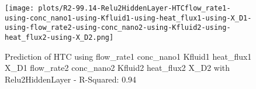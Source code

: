 
\begin{figure}[H]
    \centering
    \texttt{[image: plots/R2-99.14-Relu2HiddenLayer-HTCflow\_rate1-using-conc\_nano1-using-Kfluid1-using-heat\_flux1-using-X\_D1-using-flow\_rate2-using-conc\_nano2-using-Kfluid2-using-heat\_flux2-using-X\_D2.png]}
    \caption{Prediction of HTC using flow_rate1 conc_nano1 Kfluid1 heat_flux1 X_D1 flow_rate2 conc_nano2 Kfluid2 heat_flux2 X_D2 with Relu2HiddenLayer - R-Squared: 0.94}
\end{figure}
